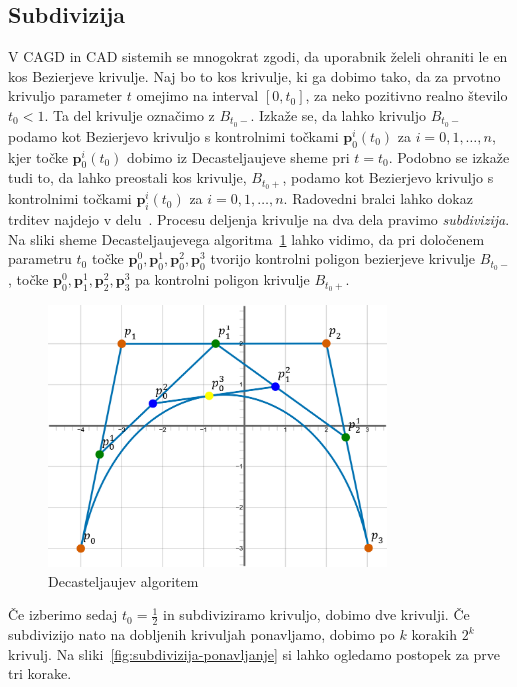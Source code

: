 \documentclass[isrm2, tisk]{fmfdelo}
\newcommand{\p}{\mathbf{p}}
\begin{document}
    \subsection{Subdivizija}
    V CAGD in CAD sistemih se mnogokrat zgodi, da uporabnik želeli ohraniti le en kos Bezierjeve krivulje.
    Naj bo to kos krivulje, ki ga dobimo tako, da za prvotno krivuljo parameter $t$ omejimo na interval $[0,t_0]$, za neko pozitivno realno število $t_0<1$.
    Ta del krivulje označimo z $B_{t_0-}$.
    Izkaže se, da lahko krivuljo $B_{t_0-}$ podamo kot Bezierjevo krivuljo s kontrolnimi točkami $\p_0^i(t_0)$ za $i=0,1,\ldots,n$, kjer točke $\p_0^i(t_0)$ dobimo iz Decasteljaujeve sheme pri $t=t_0$.
    Podobno se izkaže tudi to, da lahko preostali kos krivulje, $B_{t_0+}$, podamo kot Bezierjevo krivuljo s kontrolnimi točkami $\p_i^i(t_0)$ za $i=0,1,\ldots,n$.
    Radovedni bralci lahko dokaz trditev najdejo v delu~\cite{placeholder}.
    Procesu deljenja krivulje na dva dela pravimo \textit{subdivizija}.
    Na sliki sheme Decasteljaujevega algoritma~\ref{fig:subdivizija} lahko vidimo, da pri določenem parametru $t_0$ točke $\p_0^0,\p_0^1,\p_0^2,\p_0^3$ tvorijo kontrolni poligon bezierjeve krivulje $B_{t_0-}$, točke $\p_0^0,\p_1^1,\p_2^2,\p_3^3$ pa kontrolni poligon krivulje $B_{t_0+}$.
    \begin{figure}[h]
        \centering
        \includegraphics[width=0.8\textwidth]{images/subdivizija}
        \caption{Decasteljaujev algoritem}
        \label{fig:subdivizija}
    \end{figure}
    Če izberimo sedaj $t_0=\frac{1}{2}$ in subdiviziramo krivuljo, dobimo dve krivulji.
    Če subdivizijo nato na dobljenih krivuljah ponavljamo, dobimo po $k$ korakih $2^k$ krivulj.
    Na sliki~\ref{fig:subdivizija-ponavljanje} si lahko ogledamo postopek za prve tri korake.
\end{document}
